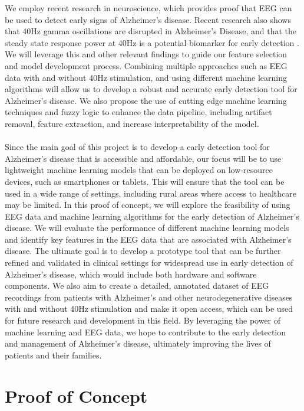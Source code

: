 \documentclass[openany]{book}
\begin{document}
    We employ recent research in neuroscience, which provides proof that EEG can be used to detect early signs of Alzheimer's disease. Recent research also shows that 40Hz gamma oscillations are disrupted in Alzheimer's Disease, and that the steady state response power at 40Hz is a potential biomarker for early detection \cite{iaccarino2016gamma}. We will leverage this and other relevant findings to guide our feature selection and model development process. Combining multiple approaches such as EEG data with and without 40Hz stimulation, and using different machine learning algorithms will allow us to develop a robust and accurate early detection tool for Alzheimer's disease. We also propose the use of cutting edge machine learning techniques and fuzzy logic to enhance the data pipeline, including artifact removal, feature extraction, and increase interpretability of the model. \\\\
    Since the main goal of this project is to develop a early detection tool for Alzheimer's disease that is accessible and affordable, our focus will be to use lightweight machine learning models that can be deployed on low-resource devices, such as smartphones or tablets. This will ensure that the tool can be used in a wide range of settings, including rural areas where access to healthcare may be limited. In this proof of concept, we will explore the feasibility of using EEG data and machine learning algorithms for the early detection of Alzheimer's disease. We will evaluate the performance of different machine learning models and identify key features in the EEG data that are associated with Alzheimer's disease. The ultimate goal is to develop a prototype tool that can be further refined and validated in clinical settings for widespread use in early detection of Alzheimer's disease, which would include both hardware and software components. We also aim to create a detailed, annotated dataset of EEG recordings from patients with Alzheimer's and other neurodegenerative diseases with and without 40Hz stimulation and make it open access, which can be used for future research and development in this field. By leveraging the power of machine learning and EEG data, we hope to contribute to the early detection and management of Alzheimer's disease, ultimately improving the lives of patients and their families.


\chapter{Proof of Concept}
\end{document}

